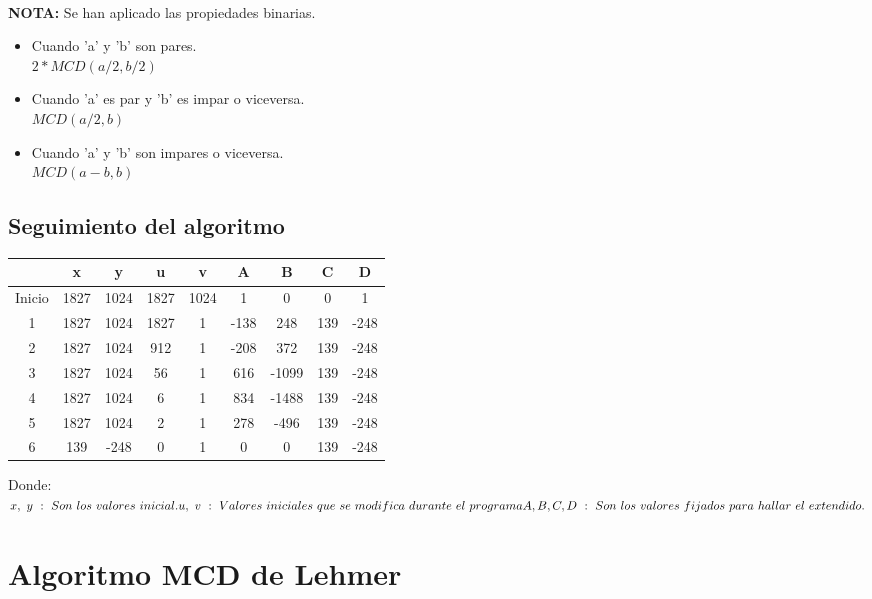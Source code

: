 \documentclass[11pt, conference]{IEEEtran}
\begin{document}
\

\textbf{NOTA:} Se han aplicado las propiedades binarias.
\begin{itemize}
	\item Cuando 'a' y 'b' son pares. \\
	$2*MCD(a/2,b/2)$
	\item Cuando 'a' es par y 'b' es impar o viceversa. \\
	$MCD(a/2,b)$
	\item Cuando 'a' y 'b' son impares o viceversa. \\
	$MCD(a-b,b)$
\end{itemize}

\subsection{Seguimiento del algoritmo}
\begin{center}
	\begin{tabular}{|c|c|c|c|c|c|c|c|c|}
		\hline
		& \textbf{x} & \textbf{y} & \textbf{u} & \textbf{v} & \textbf{A}& \textbf{B}& \textbf{C}& \textbf{D} \\	\hline
		Inicio &  1827 & 1024 & 1827 & 1024 & 1 & 0 & 0 & 1\\ \hline
		1 & 1827 & 1024 & 1827 & 1 & -138 & 248 & 139& -248\\ \hline
		2 & 1827  & 1024 & 912 & 1 & -208 & 372 & 139 & -248\\ \hline
		3 & 1827  & 1024 & 56 & 1 & 616 & -1099 & 139 & -248\\ \hline
		4 & 1827  & 1024 & 6 & 1 & 834 & -1488 & 139 & -248\\ \hline
		5 & 1827  & 1024 & 2 & 1 & 278 & -496 & 139 & -248\\ \hline
		6 & 139  & -248 & 0 & 1 & 0 & 0 & 139 & -248\\ \hline
	\end{tabular}
\end{center}
Donde:\\
$
x,\ y\ :\ Son\ los\ valores\ inicial. \\
u,\ v\ :\ Valores\ iniciales\ que\ se\ modifica\ durante\ el\ programa \\
A,B,C,D\ :\ Son\ los\ valores\ fijados\ para\ hallar\ el\ extendido.\\ 
$
\pagebreak
\section{Algoritmo MCD de Lehmer}
\end{document}
